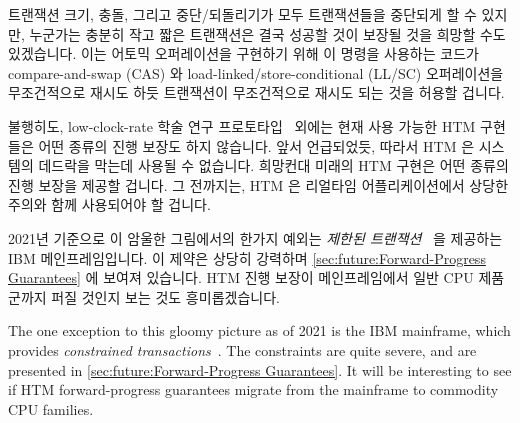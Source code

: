 트랜잭션 크기, 충돌, 그리고 중단/되돌리기가 모두 트랜잭션들을 중단되게 할 수
있지만, 누군가는 충분히 작고 짧은 트랜잭션은 결국 성공할 것이 보장될 것을
희망할 수도 있겠습니다.
이는 어토믹 오퍼레이션을 구현하기 위해 이 명령을 사용하는 코드가
compare-and-swap (CAS) 와 load-linked/store-conditional (LL/SC) 오퍼레이션을
무조건적으로 재시도 하듯 트랜잭션이 무조건적으로 재시도 되는 것을 허용할
겁니다.

불행히도, low-clock-rate 학술 연구
프로토타입~\cite{MartinSchoeberl2010realtimeTM} 외에는 현재 사용 가능한 HTM
구현들은 어떤 종류의 진행 보장도 하지 않습니다.
앞서 언급되었듯, 따라서 HTM 은 시스템의 데드락을 막는데 사용될 수 없습니다.
희망컨대 미래의 HTM 구현은 어떤 종류의 진행 보장을 제공할 겁니다.
그 전까지는, HTM 은 리얼타임 어플리케이션에서 상당한 주의와 함께 사용되어야 할
겁니다.

\iffalse

Even though transaction size, conflicts, and aborts/rollbacks can all
cause transactions to abort, one might hope that sufficiently small and
short-duration transactions could be guaranteed to eventually succeed.
This would permit a transaction to be unconditionally retried, in the
same way that compare-and-swap (CAS) and load-linked/store-conditional
(LL/SC) operations are unconditionally retried in code that uses these
instructions to implement atomic operations.

Unfortunately, other than low-clock-rate academic research
prototypes~\cite{MartinSchoeberl2010realtimeTM},
currently available HTM implementations refuse to make any
sort of forward-progress guarantee.
As noted earlier, HTM therefore cannot be used to avoid deadlock on
those systems.
Hopefully future implementations of HTM will provide some sort of
forward-progress guarantees.
Until that time, HTM must be used with extreme caution in real-time
applications.

\fi

2021년 기준으로 이 암울한 그림에서의 한가지 예외는 \emph{제한된
트랜잭션}~\cite{ChristianJacobi2012MainframeTM} 을 제공하는 IBM
메인프레임입니다.
이 제약은 상당히 강력하며
\cref{sec:future:Forward-Progress Guarantees} 에 보여져 있습니다.
HTM 진행 보장이 메인프레임에서 일반 CPU 제품군까지 퍼질 것인지 보는 것도
흥미롭겠습니다.

\iffalse

The one exception to this gloomy picture as of 2021 is
the IBM mainframe, which provides
\emph{constrained transactions}~\cite{ChristianJacobi2012MainframeTM}.
The constraints are quite severe, and are presented in
\cref{sec:future:Forward-Progress Guarantees}.
It will be interesting to see if HTM forward-progress guarantees migrate
from the mainframe to commodity CPU families.

